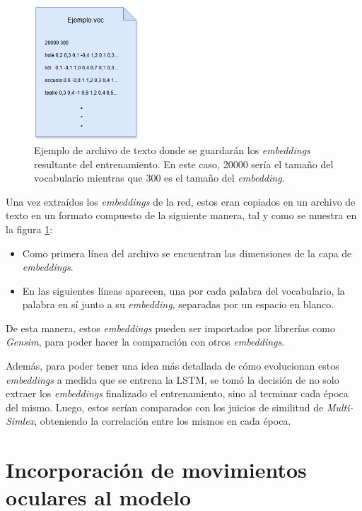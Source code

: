 \begin{figure}[H]
    \centering
    \includegraphics[width=0.35\textwidth]{imagenes/archivo.png}
    \caption{Ejemplo de archivo de texto donde se guardarán los \textit{embeddings} resultante del entrenamiento. En este caso, 20000 sería el tamaño del vocabulario mientras que 300 es el tamaño del \textit{embedding}.}
    \label{fig:archivo_embedding}
\end{figure}

Una vez extraídos los \textit{embeddings} de la red, estos eran copiados en un archivo de texto en un formato compuesto de la siguiente manera, tal y como se muestra en la figura \ref{fig:archivo_embedding}:

\begin{itemize}
    \item Como primera línea del archivo se encuentran las dimensiones de la capa de \textit{embeddings}.
    \item En las siguientes líneas aparecen, una por cada palabra del vocabulario, la palabra en sí junto a su \textit{embedding}, separadas por un espacio en blanco.
\end{itemize}

De esta manera, estos \textit{embeddings} pueden ser importados por librerías como \textit{Gensim}, para poder hacer la comparación con otros \textit{embeddings}.

Además, para poder tener una idea más detallada de cómo evolucionan estos \textit{embeddings} a medida que se entrena la LSTM, se tomó la decisión de no solo extraer los \textit{embeddings} finalizado el entrenamiento, sino al terminar cada época del mismo. Luego, estos serían comparados con los juicios de similitud de \textit{Multi-Simlex}, obteniendo la correlación entre los mismos en cada época.

\section{Incorporación de movimientos oculares al modelo}

